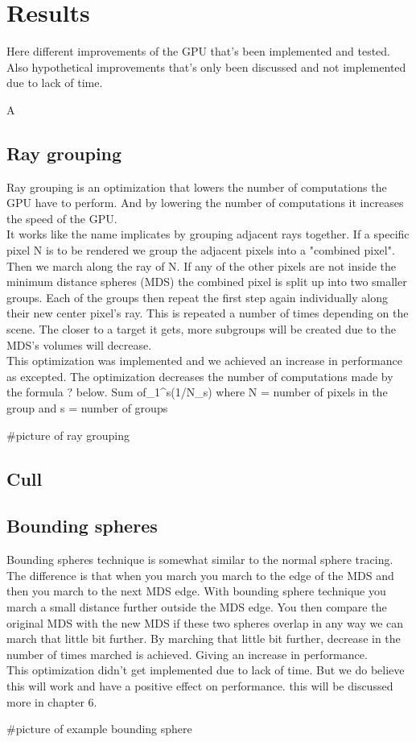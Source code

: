 \chapter{Results}

Here different improvements of the GPU that's been implemented and tested. Also hypothetical improvements that's only been discussed and not implemented due to lack of time.  



A
	\section{Ray grouping}
	Ray grouping is an optimization that lowers the number of computations the GPU have to perform. And by lowering the number of computations it increases the speed of the GPU.\\
	It works like the name implicates by grouping adjacent rays together. If a specific pixel N is to be rendered we group the adjacent pixels into a "combined pixel". Then we march along the ray of N. If any of the other pixels are not inside the minimum distance spheres (MDS) the combined pixel is split up into two smaller groups. Each of the groups then repeat the first step again individually along their new center pixel's ray. This is repeated a number of times depending on the scene. The closer to a target it gets, more subgroups will be created due to the MDS's volumes will decrease.\\ This optimization was implemented and we achieved an increase in performance as excepted. The optimization decreases the number of computations made by the formula ? below.
	Sum of_1^s(1/N_s) where N = number of pixels in the group and s = number of groups
	
	#picture of ray grouping
	
	
	\section{Cull}
	
	

	\section{Bounding spheres}
	Bounding spheres technique is somewhat similar to the normal sphere tracing. The difference is that when you march you march to the edge of the MDS and then you march to the next MDS edge. With bounding sphere technique you march a small distance further outside the MDS edge. You then compare the original MDS with the new MDS if these two spheres overlap in any way we can march that little bit further. By marching that little bit further, decrease in the number of times marched is achieved. Giving an increase in performance.  \\ This optimization didn't get implemented due to lack of time. But we do believe this will work and have a positive effect on performance. this will be discussed more in chapter 6.
	
	#picture of example bounding sphere
	
	
	
	
	
	
	
